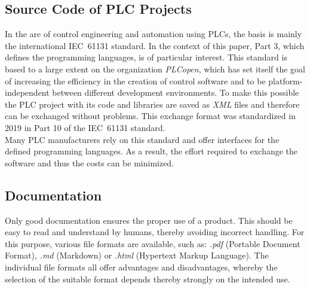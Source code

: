 \subsection{Source Code of PLC Projects}		%
	In the are of control engineering and automation using PLCs, the basis is mainly the international IEC~61131 standard. In the context of this paper, Part 3, which defines the programming languages, is of particular interest. 
	This standard is based to a large extent on the organization \textit{PLCopen}, which has set itself the goal of increasing the efficiency in the creation of control software and to be platform-independent between different development environments. To make this possible the PLC project with its code and libraries are saved as \textit{XML} files and therefore can be exchanged without problems. This exchange format was standardized in 2019 in Part 10 of the IEC~61131 standard. \\
	
	Many PLC manufacturers rely on this standard and offer interfaces for the defined programming languages. As a result, the effort required to exchange the software and thus the costs can be minimized. 


\subsection{Documentation}		%
	Only good documentation ensures the proper use of a product. This should be easy to read and understand by humans, thereby avoiding incorrect handling. For this purpose, various file formats are available, such as: \textit{.pdf} (Portable Document Format), \textit{.md} (Markdown) or \textit{.html} (Hypertext Markup Language). The individual file formats all offer advantages and disadvantages, whereby the selection of the suitable format depends thereby strongly on the intended use. \\
	
	
